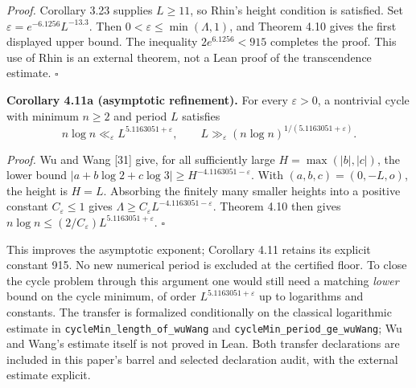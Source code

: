 \documentclass[12pt]{article}
\begin{document}
\emph{Proof.} Corollary 3.23 supplies \(L\ge11\), so Rhin's height
condition is satisfied. Set \(\varepsilon=e^{-6.1256}L^{-13.3}\). Then
\(0<\varepsilon\le\min(\Lambda,1)\), and Theorem 4.10 gives the first
displayed upper bound. The inequality \(2e^{6.1256}<915\) completes the
proof. This use of Rhin is an external theorem, not a Lean proof of the
transcendence estimate. \(\square\)

\textbf{Corollary 4.11a (asymptotic refinement).} For every
\(\varepsilon>0\), a nontrivial cycle with minimum \(n\ge2\) and period
\(L\) satisfies \[
n\log n\ll_\varepsilon L^{5.1163051+\varepsilon},\qquad
L\gg_\varepsilon(n\log n)^{1/(5.1163051+\varepsilon)}.
\]

\emph{Proof.} Wu and Wang {[}31{]} give, for all sufficiently large
\(H=\max(|b|,|c|)\), the lower bound
\(|a+b\log2+c\log3|\ge H^{-4.1163051-\varepsilon}\). With
\((a,b,c)=(0,-L,o)\), the height is \(H=L\). Absorbing the finitely many
smaller heights into a positive constant \(C_\varepsilon\le1\) gives
\(\Lambda\ge C_\varepsilon L^{-4.1163051-\varepsilon}\). Theorem 4.10
then gives \(n\log n\le(2/C_\varepsilon)L^{5.1163051+\varepsilon}\).
\(\square\)

This improves the asymptotic exponent; Corollary 4.11 retains its
explicit constant 915. No new numerical period is excluded at the
certified floor. To close the cycle problem through this argument one
would still need a matching \emph{lower} bound on the cycle minimum, of
order \(L^{5.1163051+\varepsilon}\) up to logarithms and constants. The
transfer is formalized conditionally on the classical logarithmic
estimate in \texttt{\nolinkurl{cycleMin_length_of_wuWang}} and
\texttt{\nolinkurl{cycleMin_period_ge_wuWang}}; Wu and Wang's estimate
itself is not proved in Lean. Both transfer declarations are included in
this paper's barrel and selected declaration audit, with the external
estimate explicit.
\end{document}
